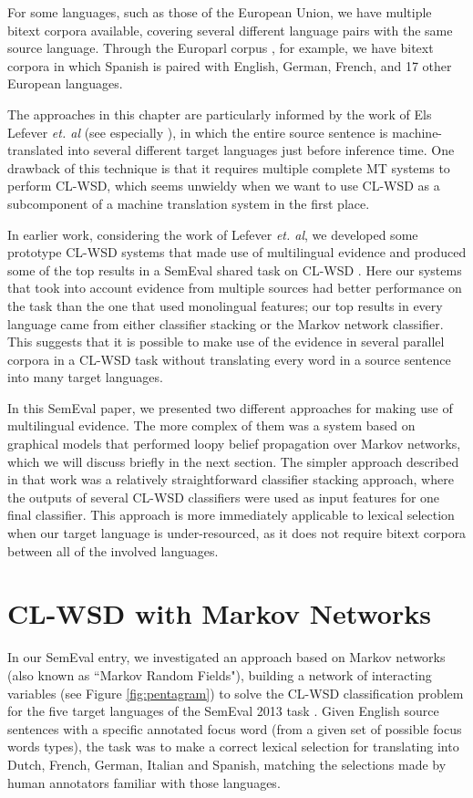 For some languages, such as those of the European Union, we have multiple
bitext corpora available, covering several different language pairs with the
same source language. Through the Europarl corpus \cite{europarl}, for example,
we have bitext corpora in which Spanish is paired with English, German, French,
and 17 other European languages.


The approaches in this chapter are particularly informed by the work of Els
Lefever \emph{et. al} (see especially
\cite{lefever-hoste-decock:2011:ACL-HLT2011}), in which the entire source
sentence is machine-translated into several different target languages just
before inference time. One drawback of this technique is that it requires
multiple complete MT systems to perform CL-WSD, which seems unwieldy when we
want to use CL-WSD as a subcomponent of a machine translation system in the
first place.

In earlier work, considering the work of Lefever \emph{et. al}, we developed
some prototype CL-WSD systems that made use of multilingual evidence
\cite{rudnick-liu-gasser:2013:SemEval-2013} and produced some of the top
results in a SemEval shared task on CL-WSD \cite{task10}.
Here our systems that took into account evidence from multiple sources had
better performance on the task than the one that used monolingual features; our
top results in every language came from either classifier stacking or the
Markov network classifier. This suggests that it is possible to make use
of the evidence in several parallel corpora in a CL-WSD task without
translating every word in a source sentence into many target languages.

In this SemEval paper, we presented two different approaches for making use of
multilingual evidence. The more complex of them was a system based on graphical
models that performed loopy belief propagation over Markov networks, which we
will discuss briefly in the next section. The simpler approach described in
that work was a relatively straightforward classifier stacking approach, where
the outputs of several CL-WSD classifiers were used as input features for one
final classifier. This approach is more immediately applicable to lexical
selection when our target language is under-resourced, as it does not require
bitext corpora between all of the involved languages.

\section{CL-WSD with Markov Networks}
In our SemEval entry, we investigated an approach based on Markov networks
(also known as ``Markov Random Fields"), building a network of interacting
variables (see Figure \ref{fig:pentagram}) to solve the CL-WSD classification
problem for the five target languages of the SemEval 2013 task \cite{task10}.
Given English source sentences with a specific annotated focus word (from a
given set of possible focus words types), the task was to make a correct
lexical selection for translating into Dutch, French, German, Italian and
Spanish, matching the selections made by human annotators familiar with those
languages.

